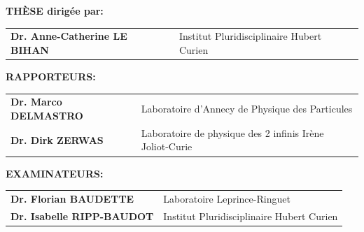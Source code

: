 \begin{titlepage}
\begin{center}
      \end{center}
      
       \small
      
       \vspace*{0.2cm}
      
       {\large \textbf{THÈSE dirigée par:}} %
      
       \vspace*{0.5cm}
      
       \setlength{\tabcolsep}{0.5cm}
       \begin{tabular}{ll}
             \textbf{Dr. Anne-Catherine LE BIHAN}          & Institut Pluridisciplinaire Hubert Curien\\
       \end{tabular}
      
       \hrulefill
      
       \vspace*{0.5cm}
      
      
      
      
             {\large \textbf{RAPPORTEURS:}} %
      
             \vspace*{0.5cm}
      
             \setlength{\tabcolsep}{.5cm}
             \begin{tabular}{ll}
                   \textbf{Dr. Marco DELMASTRO} & Laboratoire d'Annecy de Physique des Particules\\
                   \textbf{Dr. Dirk ZERWAS} & Laboratoire de physique des 2 infinis Irène Joliot-Curie \\
             \end{tabular}
      
             \vspace*{0.8cm}
      
             {\large \textbf{EXAMINATEURS:}} %
      
             \vspace*{0.5cm}
      
             \setlength{\tabcolsep}{0.5cm}
             \begin{tabular}{ll}
                  \textbf{Dr. Florian BAUDETTE}          &  Laboratoire Leprince-Ringuet\\
                  \textbf{Dr. Isabelle RIPP-BAUDOT}          & Institut Pluridisciplinaire Hubert Curien\\

             \end{tabular}
      
      
      
      \end{titlepage}